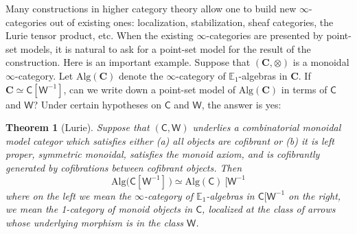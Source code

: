 \documentclass[a4paper,12pt]{amsart}
\theoremstyle{plain}
\newtheorem{theorem}{Theorem}[section]
\theoremstyle{definition}
\theoremstyle{remark}
\begin{document}
Many constructions in higher category theory allow one to build new $\infty$-categories out of existing ones: localization, stabilization, sheaf categories, the Lurie tensor product, etc. When the existing $\infty$-categories are presented by point-set models, it is natural to ask for a point-set model for the result of the construction. Here is an important example. Suppose that $(\mathbf C, \otimes)$ is a {monoidal} $\infty$-category. Let $\mathrm{Alg}(\mathbf C)$ denote the $\infty$-category of $\mathbb E_1$-algebras in $\mathbf C$. If $\mathbf C \simeq \mathsf C[\mathsf W^{-1}]$, can we write down a point-set model of $\mathrm{Alg}(\mathbf C)$ in terms of $\mathsf C$ and $\mathsf W$? Under certain hypotheses on $\mathsf C$ and $\mathsf W$, the answer is %
yes:

\begin{theorem}[Lurie] \label{lurie theorem} Suppose that $(\mathsf C,\mathsf W)$ underlies a combinatorial monoidal model categor which satisfies either (a) all objects %
are cofibrant or \textup{(b)} it is %
left proper, symmetric monoidal, satisfies the monoid axiom, and is cofibrantly generated by cofibrations between cofibrant objects. %
Then
	\begin{equation}
	    \label{eq: lurie equivalence}\mathrm{Alg}\big(\mathsf C[\mathsf W^{-1}]\, \big) \simeq \mathrm{Alg}(\mathsf C)~[\mathsf W^{-1}
	\end{equation} 
	where %
on the left we mean the $\infty$-category of $\mathbb E_1$-algebras %
in $\mathsf C[\mathsf W^{-1}$ on %
the right, we mean the 1-category of monoid objects in $\mathsf C$, localized at the class of arrows whose underlying morphism is in the class $\mathsf W$. 	
\end{theorem}
\end{document}

